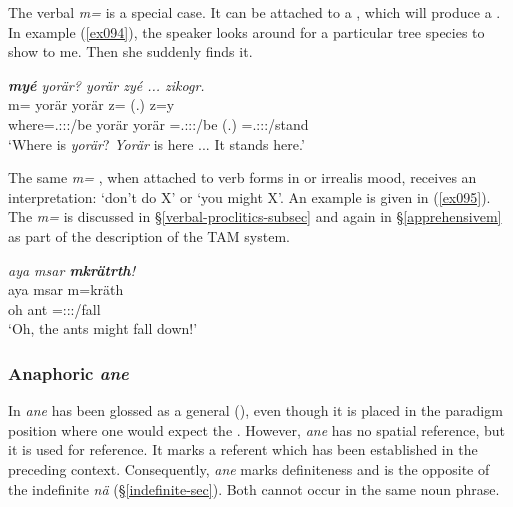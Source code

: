 The verbal  \emph{m=} is a special case. It can be attached to a , which will produce a . In example (\ref{ex094}), the speaker looks around for a particular tree species to show to me. Then she suddenly finds it.

\begin{exe}
	\ex \emph{\textbf{myé} yorär? yorär zyé ... zikogr.}\\
	\gll m= yorär yorär z= (.) z=y\\
	where=\Tsg.\Masc:\Sbj:\Nonpast:\Ipfv/be yorär yorär \Prox=\Tsg.\Masc:\Sbj:\Nonpast:\Ipfv/be (.) \Prox=\Tsg.\Masc:\Sbj:\Nonpast:\Stat/stand\\
	\trans `Where is \emph{yorär}? \emph{Yorär} is here ... It stands here.'
	\label{ex094}
\end{exe}

The same \emph{m=} , when attached to verb forms in  or irrealis mood, receives an  interpretation: `don't do X' or `you might X'. An example is given in (\ref{ex095}). The \emph{m=}  is discussed in {\S}\ref{verbal-proclitics-subsec} and again in {\S}\ref{apprehensivem} as part of the description of the TAM system.

\begin{exe}
	\ex \emph{aya msar \textbf{mkrätrth}!}\\
	\gll aya msar m=kräth\\
	oh ant {\Appr}=\Stpl:\Sbj:\Irr:\Pfv/fall\\
	\trans `Oh, the ants might fall down!' 
	\label{ex095}
\end{exe}

\subsubsection{Anaphoric \emph{ane}} \label{anaphoric-demonstrative-subsec}

In  \emph{ane} has been glossed as a general  ({\Dem}), even though it is placed in the paradigm position where one would expect the  . However, \emph{ane} has no spatial reference, but it is used for  reference. It marks a referent which has been established in the preceding context. Consequently, \emph{ane} marks definiteness and is the opposite of the indefinite \emph{nä} ({\S}\ref{indefinite-sec}). Both cannot occur in the same noun phrase.

